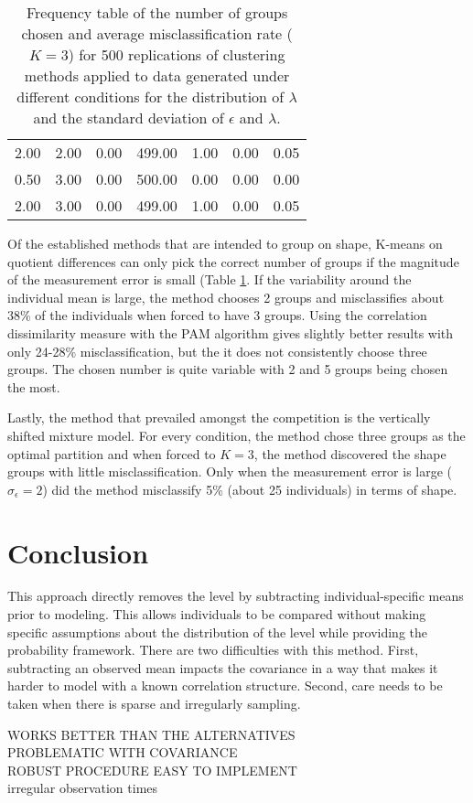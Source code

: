 \documentclass[12pt]{article}
\begin{document}
\begin{table}[ht]
\begin{center}
\begin{tabular}{cc|ccccc}
  2.00 & 2.00 & 0.00 & 499.00 & 1.00 & 0.00 & 0.05 \\ 
  0.50 & 3.00 & 0.00 & 500.00 & 0.00 & 0.00 & 0.00 \\ 
  2.00 & 3.00 & 0.00 & 499.00 & 1.00 & 0.00 & 0.05 \\ 
   \hline\end{tabular}
\caption{Frequency table of the number of groups chosen and average misclassification rate ($K=3$) for 500 replications of clustering methods applied to data generated under different conditions for the distribution of $\lambda$ and the standard deviation of $\epsilon$ and $\lambda$.}
\label{tab:freq1}
\end{center}
\end{table}

Of the established methods that are intended to group on shape, K-means on quotient differences can only pick the correct number of groups if the magnitude of the measurement error is small (Table \ref{tab:freq1}. If the variability around the individual mean is large, the method chooses 2 groups and misclassifies about 38\% of the individuals when forced to have 3 groups. Using the correlation dissimilarity measure with the PAM algorithm gives slightly better results with only 24-28\% misclassification, but the it does not consistently choose three groups. The chosen number is quite variable with 2 and 5 groups being chosen the most.

Lastly, the method that prevailed amongst the competition is the vertically shifted mixture model. For every condition, the method chose three groups as the optimal partition and when forced to $K=3$, the method discovered the shape groups with little misclassification. Only when the measurement error is large ($\sigma_{\epsilon}=2$) did the method misclassify 5\% (about 25 individuals) in terms of shape. 

\section{Conclusion}
This approach directly removes the level by subtracting individual-specific means prior to modeling. This allows individuals to be compared without making specific assumptions about the distribution of the level while providing the probability framework.  There are two difficulties with this method. First, subtracting an observed mean impacts the covariance in a way that makes it harder to model with a known correlation structure. Second, care needs to be taken when there is sparse and irregularly sampling. 

 WORKS BETTER THAN THE ALTERNATIVES\\
 PROBLEMATIC WITH COVARIANCE\\
 ROBUST PROCEDURE EASY TO IMPLEMENT\\
 irregular observation times
\end{document}

